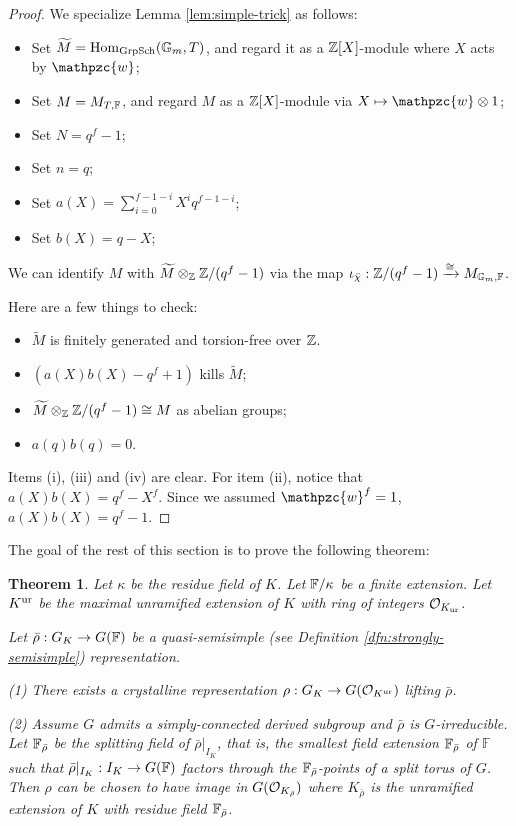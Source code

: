 \documentclass[10pt,a4paper,twoside]{article}
\newtheorem{thm}{Theorem}
\begin{document}
\begin{proof}
We specialize Lemma \ref{lem:simple-trick} as follows:
\begin{itemize}
\item Set $\widetilde{M} = \operatorname{Hom}_{\text{GrpSch}}(\mathbb{G}_m, T)$, and regard it as a ${\mathbb{Z}}[X]$-module where $X$ acts by $\mathpzc{w}$;
\item Set $M = M_{T,{\mathbb{F}}}$, and regard $M$ as a ${\mathbb{Z}}[X]$-module via $X \mapsto \mathpzc{w} \otimes 1$;
\item Set $N = q^f-1$;
\item Set $n = q$;
\item Set $a(X) = \sum_{i=0}^{f-1-i}X^iq^{f-1-i}$;
\item Set $b(X) = q-X$;
\end{itemize}
We can identify $M$ with $\widetilde{M} \otimes_{{\mathbb{Z}}} {\mathbb{Z}}/(q^f-1)$ via
the map $\iota_{\bar\chi}:{\mathbb{Z}}/(q^f-1) \xrightarrow{\cong} M_{\mathbb{G}_m, {\mathbb{F}}}$.

Here are a few things to check:
\begin{itemize}
\item [(i)] $\widetilde{M}$ is finitely generated and torsion-free over ${\mathbb{Z}}$.
\item [(ii)] $(a(X)b(X)- q^f+1)$ kills $\widetilde{M}$;
\item [(iii)] $\widetilde{M} \otimes_{{\mathbb{Z}}}{\mathbb{Z}}/(q^f-1) \cong M$ as abelian groups;
\item [(iv)] $a(q)b(q) = 0$.
\end{itemize}
Items (i), (iii) and (iv) are clear.
For item (ii), notice that
$a(X)b(X)=q^f-X^f$. Since we assumed $\mathpzc{w}^f=1$, $a(X)b(X)=q^f-1$.
\end{proof}








The goal of the rest of this section is to prove the following theorem:


\begin{thm}
\label{thm:irreducible-lift}
Let $\kappa$ be the residue field of $K$.
Let ${\mathbb{F}}/\kappa$ be a finite extension.
Let $K^{\operatorname{ur}}$ be the maximal unramified extension of $K$ with ring of integers $\mathcal{O}_{K_{\operatorname{ur}}}$.

Let $\bar\rho : G_K \to G({\mathbb{F}})$ be a quasi-semisimple (see Definition \ref{dfn:strongly-semisimple}) representation.

(1)
There exists a crystalline representation $\rho: G_K \to G(\mathcal{O}_{K^{\operatorname{ur}}})$
lifting $\bar\rho$.

(2)
Assume $G$ admits a simply-connected derived subgroup and $\bar\rho$ is $G$-irreducible.
Let ${\mathbb{F}}_{\bar\rho}$ be the splitting field of
$\bar\rho|_{I_K}$, that is, the smallest
field extension ${\mathbb{F}}_{\bar\rho}$ of $\mathbb{F}$ such that $\bar\rho|_{I_K}: I_K \to G({\mathbb{F}})$ factors through the ${\mathbb{F}}_{\bar\rho}$-points of a split torus of $G$.
Then $\rho$ can be chosen to
have image in $G(\mathcal{O}_{K_{\bar\rho}})$
where $K_{\bar\rho}$ is the unramified extension of $K$ with residue field ${\mathbb{F}}_{\bar\rho}$.
\end{thm}
\end{document}
